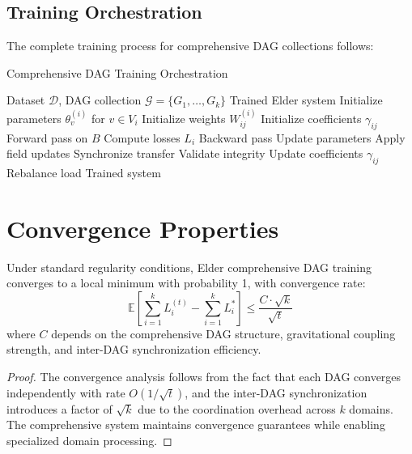 \subsection{Training Orchestration}

The complete training process for comprehensive DAG collections follows:

\begin{algorithm}[H]
\caption{Comprehensive DAG Training Orchestration}
\begin{algorithmic}[1]
\REQUIRE Dataset $\mathcal{D}$, DAG collection $\mathcal{G} = \{G_1, \ldots, G_k\}$
\ENSURE Trained Elder system
    \STATE Initialize parameters $\theta_v^{(i)}$ for $v \in V_i$
    \STATE Initialize weights $W_{ij}^{(i)}$
\ENDFOR
\STATE Initialize coefficients $\gamma_{ij}$
        \STATE Forward pass on $B$
        \STATE Compute losses $L_i$
        \STATE Backward pass
        \STATE Update parameters
        \STATE Apply field updates
        \STATE Synchronize transfer
    \ENDFOR
    \STATE Validate integrity
    \STATE Update coefficients $\gamma_{ij}$
    \STATE Rebalance load
\ENDFOR
\RETURN Trained system
\end{algorithmic}
\end{algorithm}

\section{Convergence Properties}

\begin{theorem}
Under standard regularity conditions, Elder comprehensive DAG training converges to a local minimum with probability 1, with convergence rate:
\begin{equation}
\mathbb{E}\left[\sum_{i=1}^k L_i^{(t)} - \sum_{i=1}^k L_i^*\right] \leq \frac{C \cdot \sqrt{k}}{\sqrt{t}}
\end{equation}
where $C$ depends on the comprehensive DAG structure, gravitational coupling strength, and inter-DAG synchronization efficiency.
\end{theorem}

\begin{proof}
The convergence analysis follows from the fact that each DAG converges independently with rate $O(1/\sqrt{t})$, and the inter-DAG synchronization introduces a factor of $\sqrt{k}$ due to the coordination overhead across $k$ domains. The comprehensive system maintains convergence guarantees while enabling specialized domain processing.
\end{proof}

